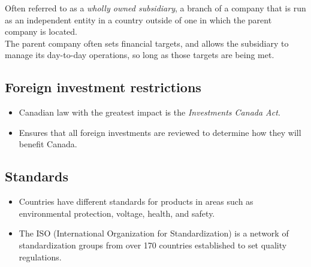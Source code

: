 \begin{definition}
    Often referred to as a \textit{wholly owned subsidiary}, a 
    branch of a company that is run as an independent entity in a country outside of one 
    in which the parent company is located. \\

    The parent company often sets financial targets, and allows the subsidiary to manage its 
    day-to-day operations, so long as those targets are being met. \\
\end{definition}

\subsection{Foreign investment restrictions}
\begin{itemize}
    \item Canadian law with the greatest impact is the \textit{Investments Canada Act}.
    \item Ensures that all foreign investments are reviewed to determine how they will benefit Canada.
\end{itemize}

\subsection{Standards}
\begin{itemize}
    \item Countries have different standards for products in areas such as environmental protection, voltage, health, and safety.
    \item The ISO (International Organization for Standardization) is a network of standardization 
    groups from over 170 countries established to set quality regulations.
\end{itemize}